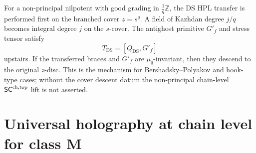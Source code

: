 \begin{remark}
\label{rem:ds-fractional-good-grading-cover}
For a non-principal nilpotent with good grading in
\(\frac1q\mathbb Z\), the DS HPL transfer is performed first on the
branched cover \(z=s^q\).  A field of Kazhdan degree \(j/q\) becomes
integral degree \(j\) on the \(s\)-cover.  The antighost primitive
\(G'_f\) and stress tensor satisfy
\[
T_{\mathrm{DS}}=[Q_{\mathrm{DS}},G'_f]
\]
upstairs.  If the transferred braces and \(G'_f\) are \(\mu_q\)-invariant,
then they descend to the original \(z\)-disc.  This is the mechanism for
Bershadsky--Polyakov and hook-type cases; without the cover descent
datum the non-principal chain-level \(\mathsf{SC}^{\mathrm{ch},\mathrm{top}}\) lift is not asserted.
\end{remark}

\section{Universal holography at chain level for class M}
\label{sec:chd-holography}


